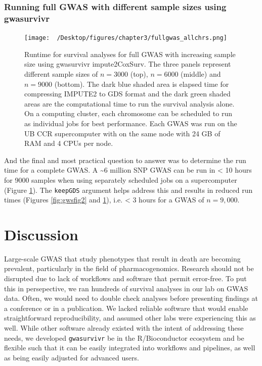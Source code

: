 \documentclass[]{DissertateOSU}
\begin{document}
\subsubsection{Running full GWAS with different sample sizes using
gwasurvivr}\label{running-full-gwas-with-different-sample-sizes-using-gwasurvivr}

\begin{figure}
    \centering
    \texttt{[image: ~/Desktop/figures/chapter3/fullgwas\_allchrs.png]}
    \caption[Runtime for survival analyses for full GWAS with increasing sample size. ]{Runtime for survival analyses for full GWAS with increasing sample size using gwasurvivr impute2CoxSurv. The three panels represent different sample sizes of $n=3000$ (top), $n=6000$ (middle) and $n=9000$ (bottom). The dark blue shaded area is elapsed time for compressing IMPUTE2 to GDS format and the dark green shaded areas are the computational time to run the survival analysis alone. On a computing cluster, each chromosome can be scheduled to run as individual jobs for best performance. Each GWAS was run on the UB CCR supercomputer with on the same node with 24 GB of RAM and 4 CPUs per node.}
    \label{fig:gwsfig4}  
\end{figure}

And the final and most practical question to answer was to determine the
run time for a complete GWAS. A \textasciitilde{}6 million SNP GWAS can
be run in \textless{} 10 hours for 9000 samples when using separately
scheduled jobs on a supercomputer (Figure \ref{fig:gwsfig4}). The
\texttt{keepGDS} argument helps address this and results in reduced run
times (Figures \ref{fig:gwsfig2} and \ref{fig:gwsfig4}), i.e.
\textless{} 3 hours for a GWAS of \(n=9,000\).

\section{Discussion}\label{discussion-2}

Large-scale GWAS that study phenotypes that result in death are becoming
prevalent, particularly in the field of pharmacogenomics. Research
should not be disrupted due to lack of workflows and software that
permit error-free. To put this in persepective, we ran hundreds of
survival analyses in our lab on GWAS data. Often, we would need to
double check analyses before presenting findings at a conference or in a
publication. We lacked reliable software that would enable
straightforward reproducibility, and assumed other labs were
experiencing this as well. While other software already existed with the
intent of addressing these needs, we developed \texttt{gwasurvivr} be in
the R/Bioconductor ecosystem and be flexible such that it can be easily
integrated into workflows and pipelines, as well as being easily
adjusted for advanced users.
\end{document}

